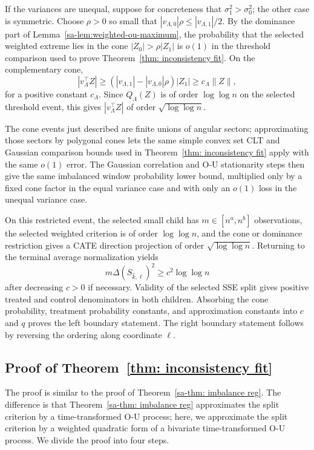 \documentclass[10pt]{article}
\theoremstyle{definition}
\theoremstyle{remark}
\begin{document}
If the variances are unequal, suppose for concreteness that $\sigma_1^2>\sigma_0^2$; the other case is symmetric. Choose $\rho>0$ so small that
$|v_{\Lambda,0}|\rho\leq |v_{\Lambda,1}|/2$. By the dominance part of Lemma~\ref{sa-lem:weighted-ou-maximum}, the probability that the selected weighted extreme lies in the cone $|Z_0|>\rho |Z_1|$ is $o(1)$ in the threshold comparison used to prove Theorem~\ref{thm: inconsistency fit}. On the complementary cone,
\[
    |v_\Lambda^\top Z|
    \geq
    (|v_{\Lambda,1}|-|v_{\Lambda,0}|\rho)|Z_1|
    \geq
    c_\Lambda \|Z\|,
\]
for a positive constant $c_\Lambda$. Since $Q_\Lambda(Z)$ is of order
$\log\log n$ on the selected threshold event, this gives
$|v_\Lambda^\top Z|$ of order $\sqrt{\log\log n}$.

The cone events just described are finite unions of angular sectors; approximating those sectors by polygonal cones lets the same simple convex set CLT and Gaussian comparison bounds used in Theorem~\ref{thm: inconsistency fit} apply with the same $o(1)$ error. The Gaussian correlation and O-U stationarity steps then give the same imbalanced window probability lower bound, multiplied only by a fixed cone factor in the equal variance case and with only an $o(1)$ loss in the unequal variance case.

On this restricted event, the selected small child has $m\in[n^a,n^b]$ observations, the selected weighted criterion is of order $\log\log n$, and the cone or dominance restriction gives a CATE direction projection of order $\sqrt{\log\log n}$. Returning to the terminal average normalization yields
\[
    m\Delta(S_{\hat k,\ell})^2
    \geq
    c^2\log\log n
\]
after decreasing $c>0$ if necessary. Validity of the selected SSE split gives positive treated and control denominators in both children. Absorbing the cone probability, treatment probability constants, and approximation constants into $c$ and $q$ proves the left boundary statement. The right boundary statement follows by reversing the ordering along coordinate $\ell$.

\subsection{Proof of Theorem~\ref{thm: inconsistency fit}}
The proof is similar to the proof of Theorem~\ref{sa-thm: imbalance reg}. The difference is that Theorem~\ref{sa-thm: imbalance reg} approximates the split criterion by a time-transformed O-U process; here, we approximate the split criterion by a weighted quadratic form of a bivariate time-transformed O-U process. We divide the proof into four steps.
\end{document}
